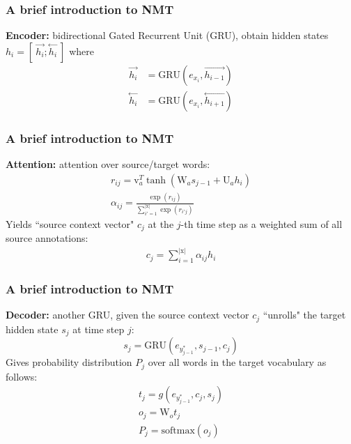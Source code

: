 \documentclass{beamer}
\begin{document}

\begin{frame}
    \frametitle{A brief introduction to NMT}
    \textbf{Encoder:} bidirectional Gated Recurrent Unit (GRU), obtain hidden states $h_i = [ \ \overset{\rightarrow}{h_i}; \overset{\leftarrow}{h_i} \ ]$ where
    \begin{align}
        \overset{\rightarrow}{h_i} &= \bm{\mathrm{GRU}}(e_{x_i}, \overset{\rightarrow}{h_{i-1}})\\
        \overset{\leftarrow}{h_i} &= \bm{\mathrm{GRU}}(e_{x_i}, \overset{\leftarrow}{h_{i+1}})
    \end{align}
\end{frame}


\begin{frame}
    \frametitle{A brief introduction to NMT}
    \textbf{Attention:} attention over source/target words:
    \begin{gather} 
        r_{ij}=\bm{\mathrm{v}}_a^T \tanh\left(\bm{\mathrm{W}}_as_{j-1} + \bm{\mathrm{U}}_ah_i\right) \label{eq:att_query} \\
        \alpha_{ij} = \frac{\exp \left( r_{ij} \right)}{\sum_{i'=1}^{|\bm{\mathrm{x}}|} \exp \left( r_{i'j} \right)} \label{eq:att_alpha}
    \end{gather}
    Yields ``source context vector" $c_j$ at the $j$-th time step as a weighted sum of all source annotations:
    \begin{gather}
        c_j = \sum\nolimits_{i=1}^{|\bm{\mathrm{x}}|}\alpha_{ij}h_i
    \end{gather}
\end{frame}


\begin{frame}
    \frametitle{A brief introduction to NMT}
    \textbf{Decoder:} another GRU, given the source context vector $c_j$ ``unrolls" the target hidden state $s_j$ at time step $j$:
    \begin{equation}
        s_j = \bm{\mathrm{GRU}}(e_{y_{j-1}^{*}}, s_{j-1}, c_j)
    \end{equation}
    Gives probability distribution $P_j$ over all words in the target vocabulary as follows:
    \begin{gather}
        t_j = g\left(e_{y_{j-1}^{*}}, c_j, s_j\right)  \label{eq:t} \\
        o_j = \bm{\mathrm{W}}_o t_j \label{eq:o} \\
        P_{j} = \mathrm{softmax}\left(o_j\right)  \label{eq:softmax}
    \end{gather}
\end{frame}
\end{document}
